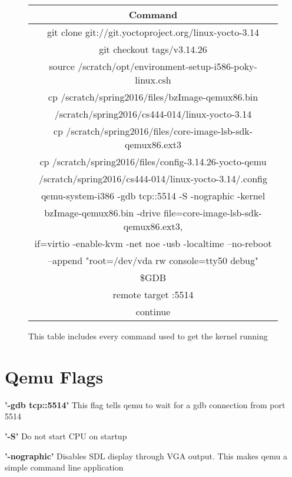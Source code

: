 \documentclass[letterpaper,draftclsnofoot,onecolumn,10pt]{article}
\begin{document}
\begin{figure}[h]
   \begin{center}
      \begin{tabular}{| c |}
	 \hline
	 \textbf{Command} \\
	 \hline
	 git clone git://git.yoctoproject.org/linux-yocto-3.14 \\
	 \hline
	 git checkout tags/v3.14.26 \\
	 \hline
	 source /scratch/opt/environment-setup-i586-poky-linux.csh \\
	 \hline
	 cp /scratch/spring2016/files/bzImage-qemux86.bin \\
	 /scratch/spring2016/cs444-014/linux-yocto-3.14 \\
	 \hline
	 cp /scratch/spring2016/files/core-image-lsb-sdk-qemux86.ext3 \\
	 \hline
	 cp /scratch/spring2016/files/config-3.14.26-yocto-qemu \\
	 /scratch/spring2016/cs444-014/linux-yocto-3.14/.config \\
	 \hline
	 qemu-system-i386 -gdb tcp::5514 -S -nographic -kernel \\
	 bzImage-qemux86.bin -drive file=core-image-lsb-sdk-qemux86.ext3, \\
	 if=virtio -enable-kvm -net noe -usb -localtime --no-reboot \\
	 --append "root=/dev/vda rw console=tty50 debug" \\
	 \hline
	 \$GDB \\
	 \hline
	 remote target :5514 \\
	 \hline
	 continue \\
	 \hline
      \end{tabular}
   \end{center}
   \caption{This table includes every command used to get the kernel running}
\end{figure}

\section{Qemu Flags}

\textbf{'-gdb tcp::5514'}
\newline
This flag tells qemu to wait for a gdb connection from port 5514

\textbf{'-S'}
\newline
Do not start CPU on startup

\textbf{'-nographic'}
\newline
Disables SDL display through VGA output. This makes qemu a simple command line application
\end{document}
